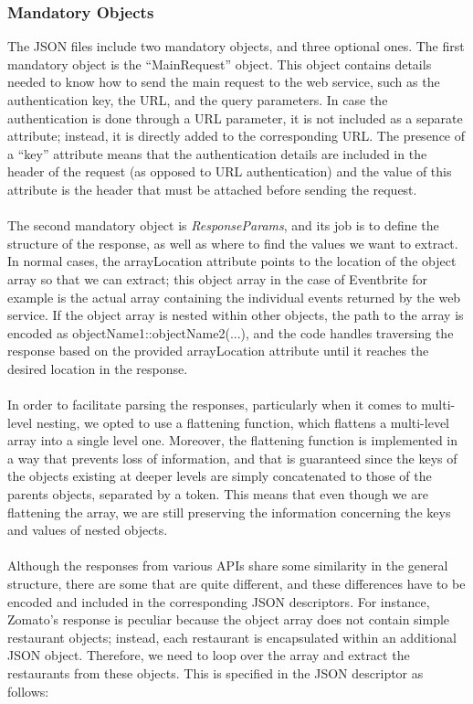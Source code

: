 \subsubsection{Mandatory Objects}
The JSON files include two mandatory objects, and three optional ones. The first mandatory object is the ``MainRequest'' object. This object contains details needed to know how to send the main request to the web service, such as the authentication key, the URL, and the query parameters. In case the authentication is done through a URL parameter, it is not included as a separate attribute; instead, it is directly added to the corresponding URL. The presence of a ``key'' attribute means that the authentication details are included in the header of the request (as opposed to URL authentication) and the value of this attribute is the header that must be attached before sending the request.\\\\
The second mandatory object is \emph{ResponseParams}, and its job is to define the structure of the response, as well as where to find the values we want to extract. In normal cases, the arrayLocation attribute points to the location of the object array so that we can extract; this object array in the case of Eventbrite for example is the actual array containing the individual events returned by the web service. If the object array is nested within other objects, the path to the array is encoded as objectName1::objectName2(...), and the code handles traversing the response based on the provided arrayLocation attribute until it reaches the desired location in the response.\\\\
In order to facilitate parsing the responses, particularly when it comes to multi-level nesting, we opted to use a flattening function, which flattens a multi-level array into a single level one. Moreover, the flattening function is implemented in a way that prevents loss of information, and that is guaranteed since the keys of the objects existing at deeper levels are simply concatenated to those of the parents objects, separated by a token. This means that even though we are flattening the array, we are still preserving the information concerning the keys and values of nested objects.\\\\
Although the responses from various APIs share some similarity in the general structure, there are some that are quite different, and these differences have to be encoded and included in the corresponding JSON descriptors. For instance, Zomato's response is peculiar because the object array does not contain simple restaurant objects; instead, each restaurant is encapsulated within an additional JSON object. Therefore, we need to loop over the array and extract the restaurants from these objects. This is specified in the JSON descriptor as follows:

